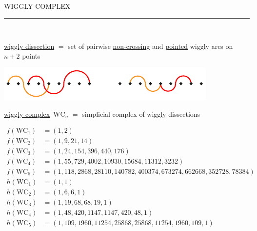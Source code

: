 \documentclass[12pt,titlepage,landscape,a4paper]{article}
\newcommand{\textemoyen}{\fontsize{23}{27}\selectfont}
\newenvironment{slide}[1]
{
\newpage
\begin{center}
{\blue \textemoyen \uppercase{#1}}\\
\end{center}
\vspace{-1cm}
\rule{\textwidth}{0.5 pt}\\
\vspace{-.8cm}
}
{\vspace*{-3cm}}
\newcommand{\blue}{\color{blue}} %
\renewcommand{\emph}[1]{\uline{#1}}
\newcommand{\wigglyComplex}{\mathrm{WC}} %
\begin{document}
\begin{slide}{Wiggly complex}

\emph{wiggly dissection} $=$ set of pairwise \emph{non-crossing} and \emph{pointed} wiggly arcs on $n+2$ points

\hspace{9.3cm}\includegraphics[scale=1.7]{incompatible}

\vspace{.2cm}
\emph{wiggly complex}~$\wigglyComplex_n$ $=$ simplicial complex of wiggly dissections

\begin{align*}
f(\wigglyComplex_1) & = (1, 2) \\
f(\wigglyComplex_2) & = (1, 9, 21, 14) \\
f(\wigglyComplex_3) & = (1, 24, 154, 396, 440, 176) \\
f(\wigglyComplex_4) & = (1, 55, 729, 4002, 10930, 15684, 11312, 3232) \\
f(\wigglyComplex_5) & = (1, 118, 2868, 28110, 140782, 400374, 673274, 662668, 352728, 78384) \\[.8cm]
h(\wigglyComplex_1) & = (1, 1) \\
h(\wigglyComplex_2) & = (1, 6, 6, 1) \\
h(\wigglyComplex_3) & = (1, 19, 68, 68, 19, 1) \\
h(\wigglyComplex_4) & = (1, 48, 420, 1147, 1147, 420, 48, 1) \\
h(\wigglyComplex_5) & = (1, 109, 1960, 11254, 25868, 25868, 11254, 1960, 109, 1)
\end{align*}

\end{slide}

\end{document}
